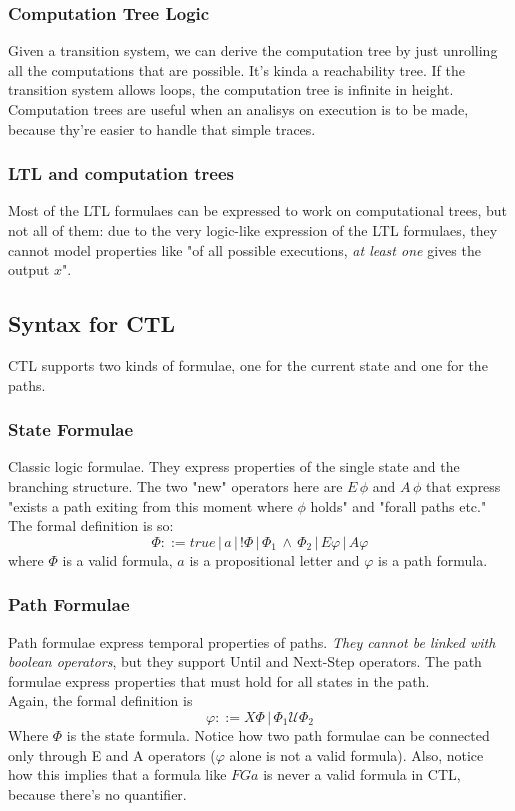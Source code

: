 \documentclass{article}
\begin{document}
				\subsubsection{Computation Tree Logic}
					Given a transition system, we can derive the computation tree by just unrolling all the computations that are possible. It's kinda a reachability tree. If the transition system allows loops, the computation tree is infinite in height. Computation trees are useful when an analisys on execution is to be made, because thy're easier to handle that simple traces.
			
				\subsubsection{LTL and computation trees}
					Most of the LTL formulaes can be expressed to work on computational trees, but not all of them: due to the very logic-like expression of the LTL formulaes, they cannot model properties like "of all possible executions, \emph{at least one} gives the output $x$".
				
			\subsection{Syntax for CTL}
				CTL supports two kinds of formulae, one for the current state and one for the paths.
						
				\subsubsection{State Formulae}
					Classic logic formulae. They express properties of the single state and the branching structure. The two "new" operators here are $E\,\phi$ and $A\,\phi$ that express "exists a path exiting from this moment where $\phi$ holds" and "forall paths etc."\\
					The formal definition is so:
					\begin{equation}
						\Phi ::= true \,\vert\, a \,\vert\, !\Phi \,\vert\, \Phi_1 \,\wedge\, \Phi_2 \,\vert\, E\varphi \,\vert\, A\varphi 
					\end{equation}
					where $\Phi$ is a valid formula, $a$ is a propositional letter and $\varphi$ is a path formula.
					
				\subsubsection{Path Formulae}
					Path formulae express temporal properties of paths. \emph{They cannot be linked with boolean operators}, but they support Until and Next-Step operators. The path formulae express properties that must hold for all states in the path.\\
					Again, the formal definition is
					\begin{equation}
						\varphi ::= X \Phi \,\vert\, \Phi_1 \mathcal{U} \Phi_2
					\end{equation}
					Where $\Phi$ is the state formula. Notice how two path formulae can be connected only through E and A operators ($\varphi$ alone is not a valid formula). Also, notice how this implies that a formula like $FG a$ is never a valid formula in CTL, because there's no quantifier.
					
\end{document}
